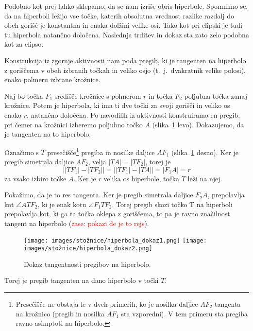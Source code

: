 Podobno kot prej lahko sklepamo, da se nam izriše obris hiperbole. Spomnimo se, da na hiperboli ležijo vse točke, katerih absolutna vrednost razlike razdalj do obeh gorišč je konstantna in enaka dolžini velike osi. Tako kot pri elipski je tudi tu hiperbola natančno določena. Naslednja trditev in dokaz sta zato zelo podobna kot za elipso.

\begin{trditev}
    Konstrukcija iz zgornje aktivnosti nam poda pregib, ki je tangenten na hiperbolo z goriščema v obeh izbranih točkah in veliko osjo (t.\ j.\ dvakratnik velike polosi), enako polmeru izbrane krožnice.
\end{trditev}

\begin{dokaz}
    Naj bo točka $F_1$ središče krožnice s polmerom $r$ in točka $F_2$ poljubna točka zunaj krožnice. Potem je hiperbola, ki ima ti dve točki za svoji gorišči in veliko os enako $r$, natančno določena. Po navodilih iz aktivnosti konstruiramo en pregib, pri čemer na krožnici izberemo poljubno točko $A$ (slika~\ref{fig:dokaz_hiperbola} levo). Dokazujemo, da je tangenten na to hiperbolo.

    Označimo s $T$ presečišče\footnote{Presečišče ne obstaja le v dveh primerih, ko je nosilka daljice $AF_2$ tangenta na krožnico (pregib in nosilka $AF_1$ sta vzporedni). V tem primeru sta pregiba ravno asimptoti na hiperbolo.} pregiba in nosilke daljice $AF_1$ (slika~\ref{fig:dokaz_hiperbola} desno). Ker je pregib simetrala daljice $AF_2$, velja $|TA| = |TF_2|$, torej je 
    $$\left||TF_1| - |TF_2|\right| = \left||TF_1| - |TA|\right| = |F_1A| = r$$
    za vsako izbiro točke $A$. Ker je $r$ velika os hiperbole, točka $T$ leži na njej.

    Pokažimo, da je to res tangenta. Ker je pregib simetrala daljice $F_2A$,  prepolavlja kot $\angle ATF_2$, ki je enak kotu $\angle F_1TF_2$. Torej pregib skozi točko T na hiperboli prepolavlja kot, ki ga ta točka oklepa z goriščema, to pa je ravno značilnost tangent na hiperbolo (\textcolor{red}{zase: pokazi de je to rejs}).

    \begin{figure}[h]
        \centering
        \texttt{[image: images/stožnice/hiperbola\_dokaz1.png]}
        \texttt{[image: images/stožnice/hiperbola\_dokaz2.png]}
        \caption[Tangentnost na hiperbolo]{Dokaz tangentnosti pregibov na hiperbolo.}
        \label{fig:dokaz_hiperbola}
    \end{figure}
    Torej je pregib tangenten na dano hiperbolo v točki $T$.
\end{dokaz}


